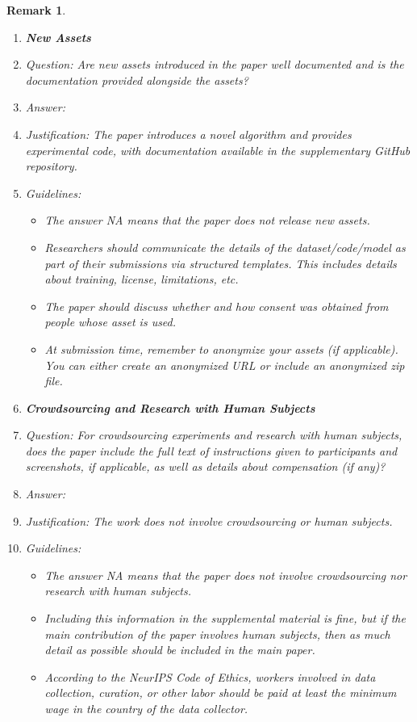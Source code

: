 \documentclass{article}
\newtheorem{remark}{Remark}
\begin{document}
\begin{remark}
\begin{enumerate}
\item {\bf New Assets}
    \item[] Question: Are new assets introduced in the paper well documented and is the documentation provided alongside the assets?
    \item[] Answer: \answerYes{}
    \item[] Justification: The paper introduces a novel algorithm and provides experimental code, with documentation available in the supplementary GitHub repository.
    \item[] Guidelines:
    \begin{itemize}
        \item The answer NA means that the paper does not release new assets.
        \item Researchers should communicate the details of the dataset/code/model as part of their submissions via structured templates. This includes details about training, license, limitations, etc. 
        \item The paper should discuss whether and how consent was obtained from people whose asset is used.
        \item At submission time, remember to anonymize your assets (if applicable). You can either create an anonymized URL or include an anonymized zip file.
    \end{itemize}

\item {\bf Crowdsourcing and Research with Human Subjects}
    \item[] Question: For crowdsourcing experiments and research with human subjects, does the paper include the full text of instructions given to participants and screenshots, if applicable, as well as details about compensation (if any)? 
    \item[] Answer: \answerNA{}
    \item[] Justification: The work does not involve crowdsourcing or human subjects.
    \item[] Guidelines:
    \begin{itemize}
        \item The answer NA means that the paper does not involve crowdsourcing nor research with human subjects.
        \item Including this information in the supplemental material is fine, but if the main contribution of the paper involves human subjects, then as much detail as possible should be included in the main paper. 
        \item According to the NeurIPS Code of Ethics, workers involved in data collection, curation, or other labor should be paid at least the minimum wage in the country of the data collector. 
    \end{itemize}


\end{enumerate}
\end{remark}
\end{document}
